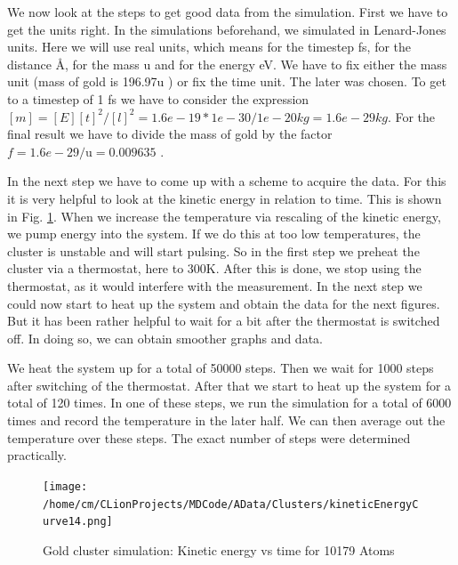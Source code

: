 \par 
We now look at the steps to get good data from the simulation. 
First we have to get the units right. In the simulations beforehand, we simulated in Lenard-Jones units. Here we will use real units, which means for the timestep fs, for the distance \r{A}, for the mass u and for the energy eV. We have to fix either the mass unit (mass of gold is 196.97u \cite{Kurzweil2015}) or fix the time unit. The later was chosen. To get to a timestep of 1 fs we have to consider the expression $ [m] = [E][t]^2/[l]^2 = 1.6e-19 * 1e-30/1e-20 kg = 1.6e-29kg $. For the final result we have to divide the mass of gold by the factor $ f = 1.6e-29/\mathrm{u} = 0.009635 $
\cite{molDymCourse}.

In the next step we have to come up with a scheme to acquire the data. For this it is very helpful to look at the kinetic energy in relation to time. This is shown in Fig. \ref{GoldClusterSimulationKinVsTime}. When we increase the temperature via rescaling of the kinetic energy, we pump energy into the system. If we do this at too low temperatures, the cluster is unstable and will start pulsing. 
So in the first step we preheat the cluster via a thermostat, here to 300K. After this is done, we stop using the thermostat, as it would interfere with the measurement. In the next step we could now start to heat up the system and obtain the data for the next figures. But it has been rather helpful to wait for a bit after the thermostat is switched off. In doing so, we can obtain smoother graphs and data. 
\par
We heat the system up for a total of 50000 steps. Then we wait for 1000 steps after switching of the thermostat. After that we start to heat up the system for a total of 120 times. In one of these steps, we run the simulation for a total of 6000 times and record the temperature in the later half. We can then average out the temperature over these steps. The exact number of steps were determined practically.
\begin{figure}
	\begin{center} 
		\texttt{[image: /home/cm/CLionProjects/MDCode/AData/Clusters/kineticEnergyCurve14.png]} 
	\end{center} 
	\caption[Gold cluster simulation: Kinetic Energy vs Time]{Gold cluster simulation: Kinetic energy vs time for 10179 Atoms} 
	\label{GoldClusterSimulationKinVsTime} 
\end{figure} 


